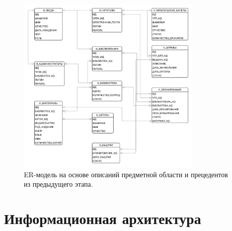 \documentclass[12pt]{report}
\begin{document}
	\begin{figure}[h]
		\centering
		\includegraphics[width=0.8\textwidth]{ER-model.png}
		\caption{ER-модель на основе описаний предметной области и прецедентов из предыдущего этапа.}
		\label{fig:ER-model}
	\end{figure}
	\newpage
	
	\section*{Информационная архитектура}
	
	
\end{document}
